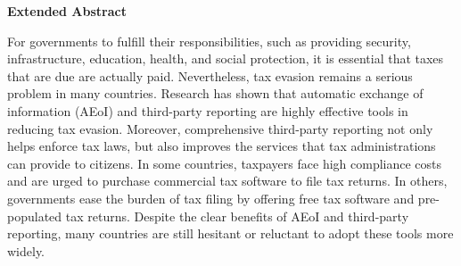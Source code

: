 \documentclass[12pt]{article}
\begin{document}




\begin{center}
\textbf{Extended Abstract}  
\end{center}
For governments to fulfill their responsibilities, such as providing security, infrastructure, education, health, and social protection, it is essential that taxes that are due are actually paid. Nevertheless, tax evasion remains a serious problem in many countries. Research has shown that automatic exchange of information (AEoI) and third-party reporting are highly effective tools in reducing tax evasion. Moreover, comprehensive third-party reporting not only helps enforce tax laws, but also improves the services that tax administrations can provide to citizens. In some countries, taxpayers face high compliance costs and are urged to purchase commercial tax software to file tax returns. In others, governments ease the burden of tax filing by offering free tax software and pre-populated tax returns. Despite the clear benefits of AEoI and third-party reporting, many countries are still hesitant or reluctant to adopt these tools more widely.
\end{document}
